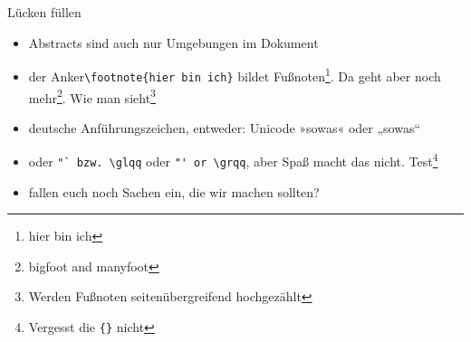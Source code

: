 \begin{frame}[fragile]{Lücken füllen}

\begin{itemize}[<+->]
    \item Abstracts sind auch nur Umgebungen im Dokument
    \item der Anker\lstinline|\footnote{hier bin ich}| bildet Fußnoten\footnote{hier bin ich}. Da geht aber noch mehr\footnote{bigfoot and manyfoot}. Wie man sieht\footnote{Werden Fußnoten seitenübergreifend hochgezählt}
    \item deutsche Anführungszeichen, entweder: Unicode »sowas« oder „sowas“
    \item oder \lstinline|"` bzw. \glqq| oder \lstinline|"' or \grqq|, aber Spaß macht das nicht. \glqq{}Test\grqq{}\footnote{Vergesst die \texttt{\{\}} nicht}
    \item fallen euch noch Sachen ein, die wir machen sollten?
\end{itemize}

\end{frame}